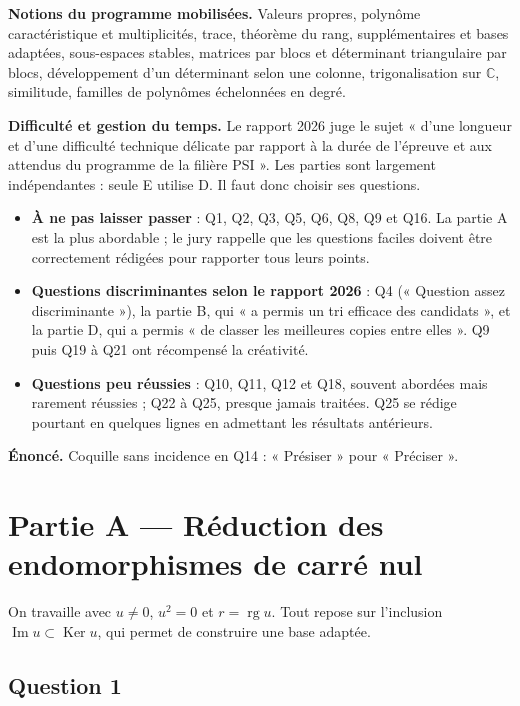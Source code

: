 \documentclass[11pt,a4paper]{article}
\providecommand{\tightlist}{\setlength{\itemsep}{0pt}\setlength{\parskip}{0pt}}
\begin{document}
\textbf{Notions du programme mobilisées.} Valeurs propres, polynôme caractéristique et multiplicités, trace, théorème du rang, supplémentaires et bases adaptées, sous-espaces stables, matrices par blocs et déterminant triangulaire par blocs, développement d'un déterminant selon une colonne, trigonalisation sur \(\mathbb C\), similitude, familles de polynômes échelonnées en degré.

\textbf{Difficulté et gestion du temps.} Le rapport 2026 juge le sujet « d'une longueur et d'une difficulté technique délicate par rapport à la durée de l'épreuve et aux attendus du programme de la filière PSI ». Les parties sont largement indépendantes : seule E utilise D. Il faut donc choisir ses questions.

\begin{itemize}
\tightlist
\item
  \textbf{À ne pas laisser passer} : Q1, Q2, Q3, Q5, Q6, Q8, Q9 et Q16. La partie A est la plus abordable ; le jury rappelle que les questions faciles doivent être correctement rédigées pour rapporter tous leurs points.
\item
  \textbf{Questions discriminantes selon le rapport 2026} : Q4 (« Question assez discriminante »), la partie B, qui « a permis un tri efficace des candidats », et la partie D, qui a permis « de classer les meilleures copies entre elles ». Q9 puis Q19 à Q21 ont récompensé la créativité.
\item
  \textbf{Questions peu réussies} : Q10, Q11, Q12 et Q18, souvent abordées mais rarement réussies ; Q22 à Q25, presque jamais traitées. Q25 se rédige pourtant en quelques lignes en admettant les résultats antérieurs.
\end{itemize}

\textbf{Énoncé.} Coquille sans incidence en Q14 : « Présiser » pour « Préciser ».

\hypertarget{partie-a-ruxe9duction-des-endomorphismes-de-carruxe9-nul}{%
\section{Partie A --- Réduction des endomorphismes de carré nul}\label{partie-a-ruxe9duction-des-endomorphismes-de-carruxe9-nul}}

On travaille avec \(u\neq0\), \(u^2=0\) et \(r=\operatorname{rg}u\). Tout repose sur l'inclusion \(\operatorname{Im}u\subset\operatorname{Ker}u\), qui permet de construire une base adaptée.

\hypertarget{question-1}{%
\subsection{Question 1}\label{question-1}}
\end{document}
